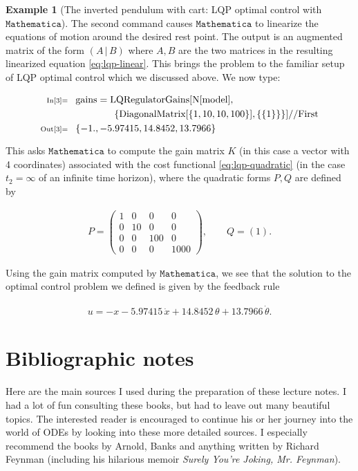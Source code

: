\documentclass[11pt]{report}
\theoremstyle{plain}
\theoremstyle{definition}
\newtheorem{example}[thm]{Example}
\begin{document}
\begin{example}[The inverted pendulum with cart: LQP optimal control with $\texttt{Mathematica}$]
\noindent The second command causes $\texttt{Mathematica}$ to
linearize the equations of motion around the desired
rest point. The output is an augmented matrix of the
form $\left( A\,|\,B\right)$ where $A, B$ are the two
matrices in the resulting linearized equation
\eqref{eq:lqp-linear}. This brings the problem to the
familiar setup of LQP optimal control which we
discussed above. We now type:

\begin{align*}
\scriptsize{\text{In[3]=}}\quad &
\text{gains}=\text{LQRegulatorGains}[\text{N}[\text{model}], \\
& \qquad\qquad
\{\text{DiagonalMatrix}[\{1,10,10,100\}],\{\{1\}\}\}]\text{//}\text{First}
\\
\scriptsize{\text{Out[3]=}}\quad &
\{-1.,-5.97415,14.8452,13.7966\}
\end{align*}

\noindent This asks $\texttt{Mathematica}$ to compute the gain
matrix $K$ (in this case a vector with 4 coordinates)
associated with the cost functional
\eqref{eq:lqp-quadratic} (in the case $t_2=\infty$ of an
infinite time horizon), where the quadratic forms
$P, Q$ are defined by

\begin{align*}
P = \left(\begin{array}{cccc}
1&0&0&0\\0&10&0&0\\0&0&100&0\\0&0&0&1000
\end{array}\right),
\qquad
Q = (1).
\end{align*}

\noindent Using the gain matrix computed by
$\texttt{Mathematica}$, we see that the solution to
the optimal control problem we defined is given by the
feedback rule

\begin{align*}
u = - x -5.97415\, \dot{x} + 14.8452\, \theta + 13.7966\, \dot{\theta}.
\end{align*}

\end{example}

\chapter*{Bibliographic notes}
Here are the main sources I used during the
preparation of these lecture notes. I had a lot of fun
consulting these books, but had to leave out many
beautiful topics. The interested reader is encouraged
to continue his or her journey into the world of ODEs
by looking into these more detailed sources. I
especially recommend the books by Arnold, Banks and
anything written by Richard Feynman (including his
hilarious memoir \emph{Surely You're Joking, Mr. Feynman}).
\end{document}
